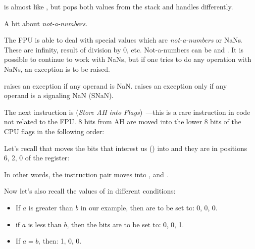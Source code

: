 



\FUCOMPP{} is almost like \FCOM, but pops both values from the stack and handles
 differently.

A bit about \emph{not-a-numbers}.

The FPU is able to deal with special values which are \emph{not-a-numbers} or \gls{NaN}s.
These are infinity, result of division by 0, etc.
Not-a-numbers can be  and . It is possible to continue to work with  NaNs, 
but if one tries to do any operation with  NaNs, an exception is to be raised.


\FCOM raises an exception if any operand is \gls{NaN}. 
\FUCOM raises an exception only if any operand is a signaling \gls{NaN} (SNaN).

\label{SAHF}

The next instruction is \SAHF (\emph{Store AH into Flags})~---this is a rare 
instruction in code not related to the FPU. 
8 bits from AH are moved into the lower 8 bits of the CPU flags in the following order:




Let's recall that \FNSTSW moves the bits that interest us (\CThreeBits) into \AH 
and they are in positions 6, 2, 0 of the \AH register:



In other words, the  instruction pair moves \CThreeBits into \ZF, \PF and \CF.

Now let's also recall the values of \CThreeBits in different conditions:

\begin{itemize}
\item If $a$ is greater than $b$ in our example, then \CThreeBits are to be set to: 0, 0, 0.
\item if $a$ is less than $b$, then the bits are to be set to: 0, 0, 1.
\item If $a=b$, then: 1, 0, 0.
\end{itemize}

